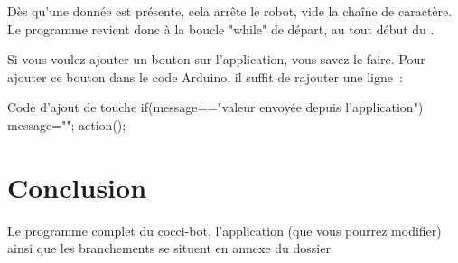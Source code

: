 Dès qu'une donnée est présente, cela arrête le robot, vide la chaîne de caractère. Le programme revient donc à la boucle "while" de départ, au tout début du .

Si vous voulez ajouter un bouton sur l'application, vous savez le faire.
Pour ajouter ce bouton dans le code Arduino, il suffit de rajouter une ligne :

\begin{Cpp}{Code d'ajout de touche}
if(message=="valeur envoyée depuis l'application")   {message="";             
                           action();}
\end{Cpp}

\section{Conclusion}
Le programme complet du cocci-bot, l'application (que vous pourrez modifier) ainsi que les branchements se situent en annexe du dossier